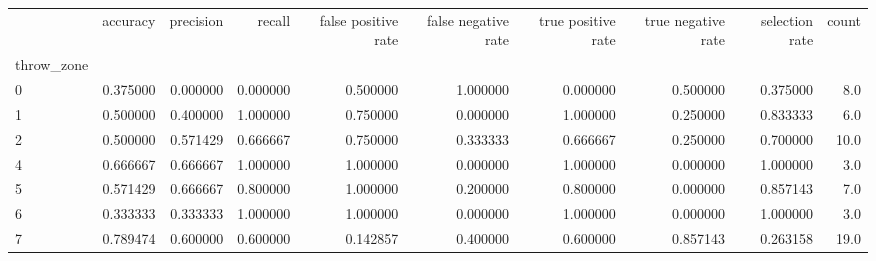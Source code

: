 \begin{tabular}{lrrrrrrrrr}
\toprule
{} &  accuracy &  precision &    recall &  false positive rate &  false negative rate &  true positive rate &  true negative rate &  selection rate &  count \\
throw\_zone &           &            &           &                      &                      &                     &                     &                 &        \\
\midrule
0          &  0.375000 &   0.000000 &  0.000000 &             0.500000 &             1.000000 &            0.000000 &            0.500000 &        0.375000 &    8.0 \\
1          &  0.500000 &   0.400000 &  1.000000 &             0.750000 &             0.000000 &            1.000000 &            0.250000 &        0.833333 &    6.0 \\
2          &  0.500000 &   0.571429 &  0.666667 &             0.750000 &             0.333333 &            0.666667 &            0.250000 &        0.700000 &   10.0 \\
4          &  0.666667 &   0.666667 &  1.000000 &             1.000000 &             0.000000 &            1.000000 &            0.000000 &        1.000000 &    3.0 \\
5          &  0.571429 &   0.666667 &  0.800000 &             1.000000 &             0.200000 &            0.800000 &            0.000000 &        0.857143 &    7.0 \\
6          &  0.333333 &   0.333333 &  1.000000 &             1.000000 &             0.000000 &            1.000000 &            0.000000 &        1.000000 &    3.0 \\
7          &  0.789474 &   0.600000 &  0.600000 &             0.142857 &             0.400000 &            0.600000 &            0.857143 &        0.263158 &   19.0 \\
\bottomrule
\end{tabular}

